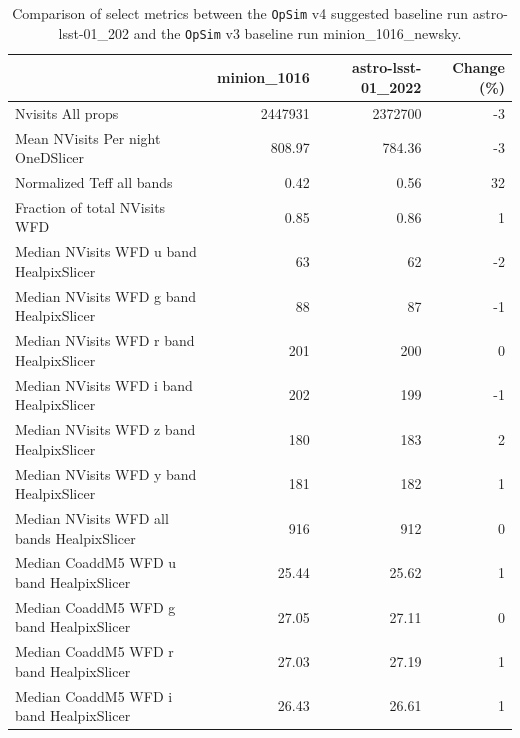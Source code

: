 \documentclass[DM,authoryear,toc]{lsstdoc}
\newcommand{\opsim}{\texttt{OpSim}\xspace}
\begin{document}
\begin{table}
\caption{Comparison of select metrics between the \opsim v4 suggested baseline run \break astro-lsst-01\_202 and the \opsim v3 baseline run minion\_1016\_newsky.}
\small
\begin{tabular}{lrrr}
\toprule
{} &  minion\_1016 &  astro-lsst-01\_2022 &  Change (\%) \\
\midrule
Nvisits All props                                  &             2447931 &             2372700 &         -3 \\
Mean NVisits Per night OneDSlicer                  &              808.97 &              784.36 &         -3 \\
Normalized Teff all bands                          &                0.42 &                0.56 &         32 \\
Fraction of total NVisits WFD                      &                0.85 &                0.86 &          1 \\
Median NVisits WFD u band HealpixSlicer            &                  63 &                  62 &         -2 \\
Median NVisits WFD g band HealpixSlicer            &                  88 &                  87 &         -1 \\
Median NVisits WFD r band HealpixSlicer            &                 201 &                 200 &          0 \\
Median NVisits WFD i band HealpixSlicer            &                 202 &                 199 &         -1 \\
Median NVisits WFD z band HealpixSlicer            &                 180 &                 183 &          2 \\
Median NVisits WFD y band HealpixSlicer            &                 181 &                 182 &          1 \\
Median NVisits WFD all bands HealpixSlicer         &                 916 &                 912 &          0 \\
Median CoaddM5 WFD u band HealpixSlicer            &               25.44 &               25.62 &          1 \\
Median CoaddM5 WFD g band HealpixSlicer            &               27.05 &               27.11 &          0 \\
Median CoaddM5 WFD r band HealpixSlicer            &               27.03 &               27.19 &          1 \\
Median CoaddM5 WFD i band HealpixSlicer            &               26.43 &               26.61 &          1 \\

\end{tabular}
\end{table}
\end{document}
